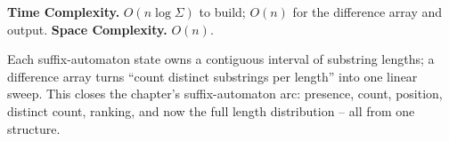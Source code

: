 \begin{complexitybox}
\textbf{Time Complexity.} $O(n\log\Sigma)$ to build; $O(n)$ for the
difference array and output. \textbf{Space Complexity.} $O(n)$.
\end{complexitybox}

\begin{takeawaybox}
Each suffix-automaton state owns a contiguous interval of substring
lengths; a difference array turns ``count distinct substrings per length''
into one linear sweep. This closes the chapter's suffix-automaton arc:
presence, count, position, distinct count, ranking, and now the full
length distribution -- all from one structure.
\end{takeawaybox}
